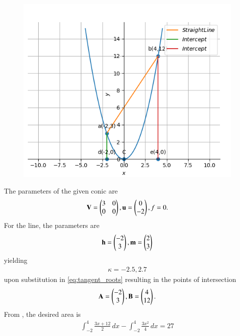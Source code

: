 	\begin{figure}[!h]
		\centering
 \includegraphics[width=\columnwidth]{chapters/12/8/3/7/figs/conic.png}
		\caption{}
		\label{fig:12/8/3/7}
  	\end{figure}
The parameters of the given conic are
\begin{align}
\mathbf{V}=\begin{pmatrix}
3 & 0\\
0 & 0
\end{pmatrix},
\mathbf{u}=\begin{pmatrix}0\\-2\end{pmatrix},
f=0.
\end{align} 
For the line, the parameters are
\begin{align}
\mathbf{h} = \begin{pmatrix}
-2\\
3
\end{pmatrix},
\mathbf{m} = \begin{pmatrix}2 \\ 3\end{pmatrix}
\end{align}
yielding
\begin{align}
    \kappa=-2.5,2.7
\end{align}
upon substitution in \eqref{eq:tangent_roots}
resulting in the points of intersection
\begin{align}
    \mathbf{A}=\begin{pmatrix}
-2\\
3
    \end{pmatrix},
    \mathbf{B}=\begin{pmatrix}
4\\
12
    \end{pmatrix}.
\end{align}
From 
		,
the desired area is 
\begin{align}
\int_{-2}^{4} \frac{3x+12}{2} \,dx
-\int_{-2}^{4}\frac{3x^2}{4} \,dx 
= 27 
\end{align}
